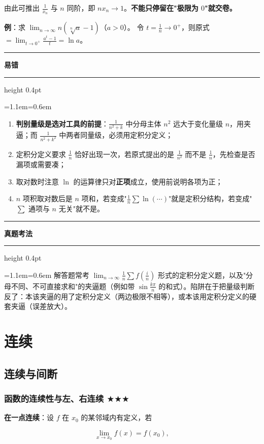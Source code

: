 \documentclass[11pt,openany,UTF8]{ctexbook}
\newcommand{\callouthead}[2]{%
  \par\addvspace{7pt}\noindent
  {\color{#1}\rule[-0.15em]{3pt}{1.05em}}\hspace{0.5em}%
  {\bfseries\color{#1}#2}\par\nobreak\vspace{-0.35em}%
  {\color{rulesep}\hrule height 0.4pt}\nobreak\vspace{0.45em}%
  \begingroup\small\setlength{\parindent}{0pt}%
  \leftskip=1.1em\rightskip=0.6em\noindent\ignorespaces}
\newcommand{\calloutend}{\par\endgroup\addvspace{7pt}}
\newenvironment{callwarn}[1]{\callouthead{warnbar}{#1}}{\calloutend}
\newenvironment{callexam}[1]{\callouthead{exambar}{#1}}{\calloutend}
\begin{document}
由此可推出 $\frac{1}{x_n}$ 与 $n$ 同阶，即 $nx_n\to 1$。\textbf{不能只停留在"极限为 $0$"就交卷。}

\textbf{例}：求 $\lim_{n\to\infty}n\left(\sqrt[n]{a}-1\right)$（$a>0$）。 令 $t=\frac1n\to 0^+$，则原式 $=\lim_{t\to 0^+}\frac{a^{t}-1}{t}=\ln a$。

\begin{callwarn}{易错}
\begin{enumerate}
\item \textbf{判别量级是选对工具的前提}：$\frac{1}{n^2+k}$ 中分母主体 $n^2$ 远大于变化量级 $n$，用夹逼；而 $\frac{1}{n^2+k^2}$ 中两者同量级，必须用定积分定义；
\item 定积分定义要求 $\frac1n$ 恰好出现一次，若原式提出的是 $\frac{1}{n^{2}}$ 而不是 $\frac1n$，先检查是否漏项或需要凑；
\item 取对数时注意 $\ln$ 的运算律只对\textbf{正项}成立，使用前说明各项为正；
\item $n$ 项积取对数后是 $n$ 项和，若变成"$\frac{1}{n}\sum\ln(\cdots)$"就是定积分结构，若变成"$\sum$ 通项与 $n$ 无关"就不是。
\end{enumerate}
\end{callwarn}

\begin{callexam}{真题考法}
解答题常考 $\lim_{n\to\infty}\frac1n\sum f\left(\frac in\right)$ 形式的定积分定义题，以及"分母不同、不可直接求和"的夹逼题（例如带 $\sin\frac{k\pi}{n}$ 的和式）。陷阱在于把量级判断反了：本该夹逼的用了定积分定义（两边极限不相等），或本该用定积分定义的硬套夹逼（误差放大）。

\end{callexam}

\section{连续}

\subsection{连续与间断}

\subsubsection{函数的连续性与左、右连续 $\bigstar$$\bigstar$$\bigstar$}

\textbf{在一点连续}：设 $f$ 在 $x_0$ 的某邻域内有定义，若

\[\lim_{x\to x_0}f(x)=f(x_0),\]
\end{document}
